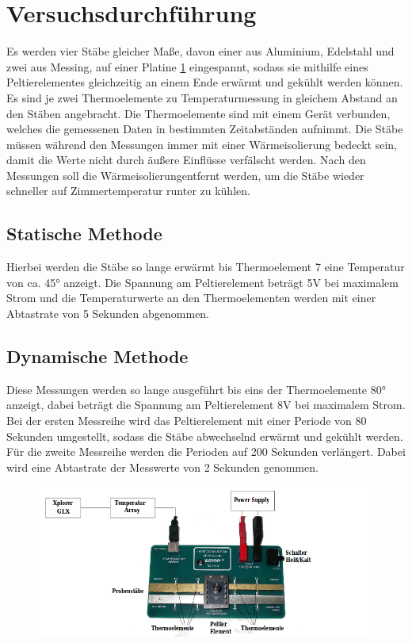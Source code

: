 \documentclass[titlepage = firstcover]{scrartcl}
\begin{document}
  \section{Versuchsdurchführung}
    Es werden vier Stäbe gleicher Maße, davon einer aus Aluminium, Edelstahl und zwei aus Messing, auf einer Platine \ref{fig:platine}
    eingespannt, sodass sie mithilfe eines Peltierelementes gleichzeitig an einem Ende erwärmt und gekühlt werden können.
    Es sind je zwei Thermoelemente zu Temperaturmessung in gleichem Abstand an den Stäben angebracht. Die Thermoelemente
    sind mit einem Gerät verbunden, welches die gemessenen Daten in bestimmten Zeitabständen aufnimmt. Die Stäbe müssen
    während den Messungen immer mit einer Wärmeisolierung bedeckt sein, damit die Werte nicht durch äußere Einflüsse
    verfälscht werden. Nach den Messungen soll die Wärmeisolierungentfernt werden, um die Stäbe wieder schneller 
    auf Zimmertemperatur runter zu kühlen.
    \subsection{Statische Methode}
      Hierbei werden die Stäbe so lange erwärmt bis Thermoelement 7 eine Temperatur von ca. 45° anzeigt. Die Spannung
      am Peltierelement beträgt 5V bei maximalem Strom und die Temperaturwerte an den Thermoelementen werden mit einer
      Abtastrate von 5 Sekunden abgenommen.
    \subsection{Dynamische Methode}
      Diese Messungen werden so lange ausgeführt bis eins der Thermoelemente 80° anzeigt, dabei beträgt die Spannung am
      Peltierelement 8V bei maximalem Strom. Bei der ersten Messreihe wird das Peltierelement mit einer Periode von
      80 Sekunden umgestellt, sodass die Stäbe abwechselnd erwärmt und gekühlt werden. Für die zweite Messreihe werden
      die Perioden auf 200 Sekunden verlängert. Dabei wird eine Abtastrate der Messwerte von 2 Sekunden genommen.
    
    \begin{figure}[h]
      \centering
      \label{fig:platine}
      \includegraphics[width = 0.7\linewidth]{Platine.png}
    \end{figure}
\end{document}
